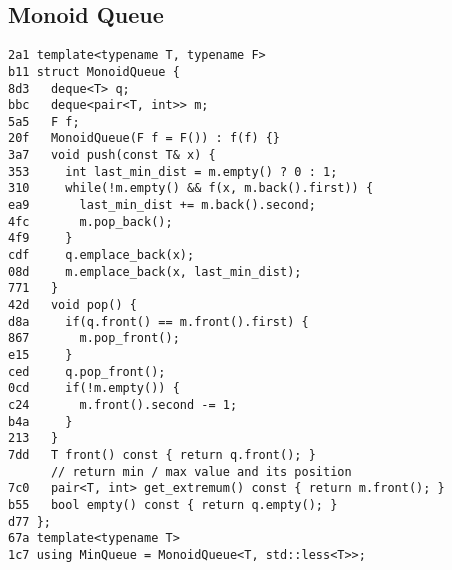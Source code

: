 \documentclass[10pt, a4paper, twoside]{article}
\begin{document}
\subsection{Monoid Queue}
\begin{lstlisting}
2a1 template<typename T, typename F>
b11 struct MonoidQueue {
8d3   deque<T> q;
bbc   deque<pair<T, int>> m;
5a5   F f;
20f   MonoidQueue(F f = F()) : f(f) {}
3a7   void push(const T& x) {
353     int last_min_dist = m.empty() ? 0 : 1;
310     while(!m.empty() && f(x, m.back().first)) {
ea9       last_min_dist += m.back().second;
4fc       m.pop_back();
4f9     }
cdf     q.emplace_back(x);
08d     m.emplace_back(x, last_min_dist);
771   }
42d   void pop() {
d8a     if(q.front() == m.front().first) {
867       m.pop_front();
e15     }
ced     q.pop_front();
0cd     if(!m.empty()) {
c24       m.front().second -= 1;
b4a     }
213   }
7dd   T front() const { return q.front(); }
      // return min / max value and its position
7c0   pair<T, int> get_extremum() const { return m.front(); }
b55   bool empty() const { return q.empty(); }
d77 };
67a template<typename T>
1c7 using MinQueue = MonoidQueue<T, std::less<T>>;
\end{lstlisting}
\end{document}

